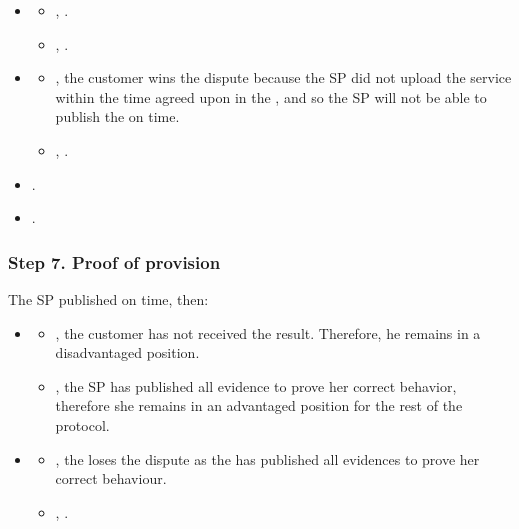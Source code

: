 \documentclass[pdftex,twocolumn,epjc3]{svjour3}
\begin{document}
{\begin{itemize}
\item \AgreeablePath
  \begin{itemize}
    \item {}, \CustomerPaidButDidntGetResult{}.
    \item {}, \SpReceivedThePayment{}.
  \end{itemize}
\item \DisputePath
  \begin{itemize}
    \item {}, the customer wins the dispute because the SP did not upload the service within the time agreed upon in the \PoD{}, and so the SP will not be able to publish the \PoP{} on time.
    \item {}, .
  \end{itemize}
\end{itemize}

\Fairness

\begin{itemize}
  \item {}.
  \item {}.
\end{itemize}

\subsubsection*{Step 7. \SPTurn{} Proof of provision}\label{step-7-publication-of-proof-of-provision}

The SP published \PoP{} on time, then:

\newcommand{\CustomerLosesBecauseSPCanProveBeingCorrect}{the \customer{} loses the dispute as the \sp{} has published all evidences to prove her correct behaviour}

\begin{itemize}
  \item \AgreeablePath
    \begin{itemize}
      \item {}, the customer has not received the result. Therefore, he remains in a disadvantaged position. 
      \item {}, the SP has published all evidence to prove her correct behavior, therefore she remains in an advantaged position for the rest of the protocol.
    \end{itemize}
  \item \DisputePath
    \begin{itemize}
      \item {}, \CustomerLosesBecauseSPCanProveBeingCorrect{}.
      \item {}, .
    \end{itemize}
\end{itemize}

}
\end{document}
